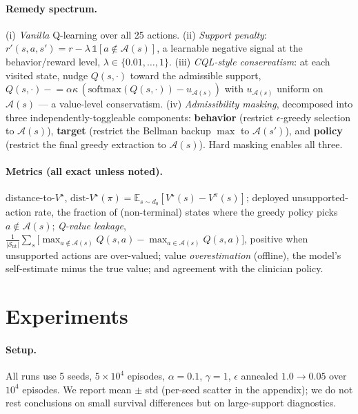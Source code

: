 \documentclass{article}
\newcommand{\Adm}{\mathcal{A}}
\newcommand{\dist}{\mathrm{dist}\text{-}V^\star}
\begin{document}
\paragraph{Remedy spectrum.}
(i) \emph{Vanilla} Q-learning over all 25 actions.
(ii) \emph{Support penalty}: $r'(s,a,s') = r - \lambda\,\mathbb{1}[a\notin\Adm(s)]$,
a learnable negative signal at the behavior/reward level, $\lambda\in\{0.01,\dots,1\}$.
(iii) \emph{CQL-style conservatism}: at each visited state, nudge $Q(s,\cdot)$ toward
the admissible support, $Q(s,\cdot)\!\mathrel{-}=\!\alpha\kappa\,(\mathrm{softmax}(Q(s,\cdot)) -
u_{\Adm(s)})$ with $u_{\Adm(s)}$ uniform on $\Adm(s)$ --- a value-level conservatism.
(iv) \emph{Admissibility masking}, decomposed into three independently-toggleable
components: \textbf{behavior} (restrict $\epsilon$-greedy selection to $\Adm(s)$),
\textbf{target} (restrict the Bellman backup $\max$ to $\Adm(s')$), and \textbf{policy}
(restrict the final greedy extraction to $\Adm(s)$). Hard masking enables all three.

\paragraph{Metrics (all exact unless noted).}
distance-to-$V^\star$, $\dist(\pi)=\mathbb{E}_{s\sim d_0}[V^\star(s)-V^\pi(s)]$;
deployed unsupported-action rate, the fraction of (non-terminal) states where the
greedy policy picks $a\notin\Adm(s)$; \emph{Q-value leakage},
$\frac{1}{|\mathcal{S}_{\mathrm{nt}}|}\sum_s\!\big[\max_{a\notin\Adm(s)}Q(s,a)-
\max_{a\in\Adm(s)}Q(s,a)\big]$, positive when unsupported actions are over-valued;
value \emph{overestimation} (offline), the model's self-estimate minus the true
value; and agreement with the clinician policy.

\section{Experiments}
\label{sec:experiments}
\paragraph{Setup.} All runs use 5 seeds, $5{\times}10^4$ episodes, $\alpha{=}0.1$,
$\gamma{=}1$, $\epsilon$ annealed $1.0{\to}0.05$ over $10^4$ episodes. We report
mean $\pm$ std (per-seed scatter in the appendix); we do not rest conclusions on
small survival differences but on large-support diagnostics.
\end{document}
